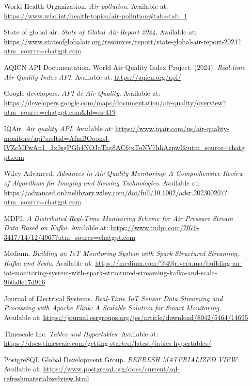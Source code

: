 \begin{thebibliography}{00}

World Health Organization. \textit{Air pollution}. Available at: \url{https://www.who.int/health-topics/air-pollution#tab=tab_1}

State of global air. \textit{State of Global Air Report 2024}. Available at: \url{https://www.stateofglobalair.org/resources/report/state-global-air-report-2024?utm_source=chatgpt.com}

AQICN API Documentation. World Air Quality Index Project. (2024). \textit{Real-time Air Quality Index API}. Available at: \url{https://aqicn.org/api/}

Google developers. \textit{API de Air Quality}. Available at: \url{https://developers.google.com/maps/documentation/air-quality/overview?utm_source=chatgpt.com&hl=es-419}

IQAir. \textit{Air quality API}. Available at: \url{https://www.iqair.com/us/air-quality-monitors/api?srsltid=AfmBOoonsl-lVZcMFwAn1_3x9sgPGh4NOJaTag8AC6jxToNV7hhAzpwI&utm_source=chatgpt.com}

Wiley Advanced. \textit{Advances in Air Quality Monitoring: A Comprehensive Review of Algorithms for Imaging and Sensing Technologies}. Available at: \url{https://advanced.onlinelibrary.wiley.com/doi/full/10.1002/adsr.202300207?utm_source=chatgpt.com}

MDPI. \textit{A Distributed Real-Time Monitoring Scheme for Air Pressure Stream Data Based on Kafka}. Available at: \url{https://www.mdpi.com/2076-3417/14/12/4967?utm_source=chatgpt.com}

Medium. \textit{Building an IoT Monitoring System with Spark Structured Streaming, Kafka and Scala}. Available at: \url{https://medium.com/%40jr.vera.ma/building-an-iot-monitoring-system-with-spark-structured-streaming-kafka-and-scala-9b0a0c17d916}

Journal of Electrical Systems. \textit{Real-Time IoT Sensor Data Streaming and Processing with Apache Flink: A Scalable Solution for Smart Monitoring}. Available at: \url{https://journal.esrgroups.org/jes/article/download/8042/5464/14695}

Timescale Inc. \textit{Tables and Hypertables}. Available at: \url{https://docs.timescale.com/getting-started/latest/tables-hypertables/}

PostgreSQL Global Development Group. \textit{REFRESH MATERIALIZED VIEW}. Available at: \url{https://www.postgresql.org/docs/current/sql-refreshmaterializedview.html}


\end{thebibliography}
